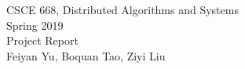 \documentclass[11pt]{article}  %
\begin{document}
\begin{center}         %
{\large                %
CSCE 668, Distributed Algorithms and Systems \\  %
Spring 2019 \\
Project Report \\
Feiyan Yu, Boquan Tao, Ziyi Liu
}
\end{center}

\end{document}
